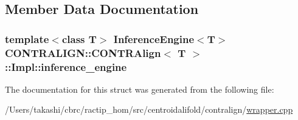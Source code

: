 \subsection{Member Data Documentation}
\hypertarget{struct_c_o_n_t_r_a_l_i_g_n_1_1_c_o_n_t_r_align_1_1_impl_a57c43c920a6541fd5c37c78bed27881a}{
\subsubsection[{inference\+\_\+engine}]{\setlength{\rightskip}{0pt plus 5cm}template$<$class T$>$ {\bf Inference\+Engine}$<$T$>$ {\bf C\+O\+N\+T\+R\+A\+L\+I\+G\+N\+::\+C\+O\+N\+T\+R\+Align}$<$ T $>$\+::Impl\+::inference\+\_\+engine}}\label{struct_c_o_n_t_r_a_l_i_g_n_1_1_c_o_n_t_r_align_1_1_impl_a57c43c920a6541fd5c37c78bed27881a}


The documentation for this struct was generated from the following file\+:\begin{DoxyCompactItemize}
\item 
/\+Users/takashi/cbrc/ractip\+\_\+hom/src/centroidalifold/contralign/\hyperlink{contralign_2wrapper_8cpp}{wrapper.\+cpp}\end{DoxyCompactItemize}
